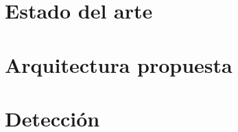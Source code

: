 \documentclass[11pt,letterpaper,oneside]{phstylee}
\begin{document}
\newpage
\thispagestyle{empty}
\cleardoublepage

%
%

\chapter{Estado del arte}
\label{cap:art}


\newpage
\thispagestyle{empty}
\cleardoublepage

\chapter{Arquitectura propuesta}
\label{cap:arq}




\newpage
\thispagestyle{empty}
\cleardoublepage

\chapter{Detección}
\label{cap:stgc}

\end{document}
